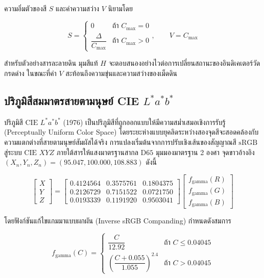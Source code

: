 ความอิ่มตัวของสี $S$ และค่าความสว่าง $V$ นิยามโดย

\begin{equation}
S = \begin{cases} 0 & \text{ถ้า } C_{\max} = 0 \\ \dfrac{\Delta}{C_{\max}} & \text{ถ้า } C_{\max} > 0 \end{cases}, \qquad V = C_{\max}
\end{equation}

สำหรับตัวอย่างสารละลายดิน มุมสีแท้ $H$ จะตอบสนองอย่างไวต่อการเปลี่ยนสถานะของอินดิเคเตอร์วัดกรดด่าง ในขณะที่ค่า $V$ สะท้อนถึงความขุ่นและความสว่างของเม็ดดิน

\subsection{ปริภูมิสีสมมาตรสายตามนุษย์ CIE $L^*a^*b^*$}
ปริภูมิสี $\text{CIE } L^*a^*b^*$ (1976) เป็นปริภูมิสีที่ถูกออกแบบให้มีความสม่ำเสมอเชิงการรับรู้ (Perceptually Uniform Color Space) โดยระยะห่างแบบยุคลิดระหว่างสองจุดสีจะสอดคล้องกับความแตกต่างที่สายตามนุษย์สัมผัสได้จริง การแปลงเริ่มต้นจากการปรับเชิงเส้นของสัญญาณสี $\text{sRGB}$ สู่ระบบ $\text{CIE } XYZ$ ภายใต้สารให้แสงมาตรฐานสากล $\text{D65}$ มุมมองมาตรฐาน 2 องศา จุดขาวอ้างอิง $(X_n, Y_n, Z_n) = (95.047, 100.000, 108.883)$ ดังนี้

\begin{equation}
\begin{bmatrix} X \\ Y \\ Z \end{bmatrix} = \begin{bmatrix} 
0.4124564 & 0.3575761 & 0.1804375 \\
0.2126729 & 0.7151522 & 0.0721750 \\
0.0193339 & 0.1191920 & 0.9503041
\end{bmatrix} \begin{bmatrix} f_{\text{gamma}}(R) \\ f_{\text{gamma}}(G) \\ f_{\text{gamma}}(B) \end{bmatrix}
\end{equation}

โดยฟังก์ชันแก้ไขแกมมาแบบผกผัน (Inverse sRGB Companding) กำหนดดังสมการ

\begin{equation}
f_{\text{gamma}}(C) = \begin{cases} 
\dfrac{C}{12.92} & \text{ถ้า } C \le 0.04045 \\[6pt]
\left( \dfrac{C + 0.055}{1.055} \right)^{2.4} & \text{ถ้า } C > 0.04045 
\end{cases}
\end{equation}

